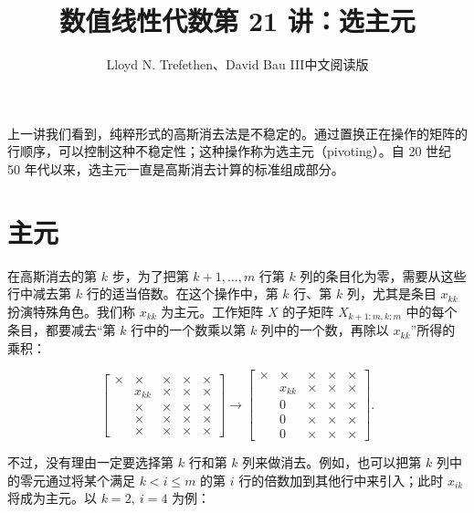 \documentclass[UTF8,fontset=none,12pt]{ctexart}
\title{数值线性代数\quad 第 21 讲：选主元}
\author{Lloyd N. Trefethen、David Bau III\quad 中文阅读版}
\date{}
\theoremstyle{definition}
\begin{document}
\maketitle
\pagestyle{plain}

上一讲我们看到，纯粹形式的高斯消去法是不稳定的。通过置换正在操作的矩阵的行顺序，可以控制这种不稳定性；这种操作称为选主元（pivoting）。自 20 世纪 50 年代以来，选主元一直是高斯消去计算的标准组成部分。

\section*{主元}

在高斯消去的第 $k$ 步，为了把第 $k+1,\ldots,m$ 行第 $k$ 列的条目化为零，需要从这些行中减去第 $k$ 行的适当倍数。在这个操作中，第 $k$ 行、第 $k$ 列，尤其是条目 $x_{kk}$ 扮演特殊角色。我们称 $x_{kk}$ 为主元。工作矩阵 $X$ 的子矩阵 $X_{k+1:m,k:m}$ 中的每个条目，都要减去“第 $k$ 行中的一个数乘以第 $k$ 列中的一个数，再除以 $x_{kk}$”所得的乘积：

\begin{equation*}
\begin{bmatrix}
\times&\times&\times&\times&\times\\
&x_{kk}&\bm{\times}&\bm{\times}&\bm{\times}\\
&\times&\times&\times&\times\\
&\times&\times&\times&\times\\
&\times&\times&\times&\times
\end{bmatrix}
\longrightarrow
\begin{bmatrix}
\times&\times&\times&\times&\times\\
&x_{kk}&\bm{\times}&\bm{\times}&\bm{\times}\\
&0&\bm{\times}&\bm{\times}&\bm{\times}\\
&0&\bm{\times}&\bm{\times}&\bm{\times}\\
&0&\bm{\times}&\bm{\times}&\bm{\times}
\end{bmatrix}.
\end{equation*}

不过，没有理由一定要选择第 $k$ 行和第 $k$ 列来做消去。例如，也可以把第 $k$ 列中的零元通过将某个满足 $k<i\le m$ 的第 $i$ 行的倍数加到其他行中来引入；此时 $x_{ik}$ 将成为主元。以 $k=2,\ i=4$ 为例：
\end{document}
